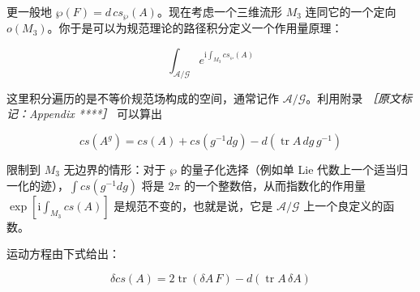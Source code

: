 
更一般地 $\wp(F)=d\,cs_\wp(A)$。现在考虑一个三维流形 $M_3$ 连同它的一个定向 $o(M_3)$。你于是可以为规范理论的路径积分定义一个作用量原理：

\begin{equation}
  \int_{\mathcal{A}/\mathcal{G}} e^{\mathrm{i}\int_{M_3}cs_\wp(A)}
  \tag{1.4}
  \label{eq:1.4}
\end{equation}

这里积分遍历的是不等价规范场构成的空间，通常记作 $\mathcal{A}/\mathcal{G}$。利用附录 {\small\itshape ［原文标记：Appendix ****］}%
可以算出

\begin{equation}
  cs(A^{g})=cs(A)+cs(g^{-1}dg)-d(\operatorname{tr}A\,dg\,g^{-1})
  \tag{1.5}
  \label{eq:1.5}
\end{equation}

限制到 $M_3$ 无边界的情形：对于 $\wp$ 的量子化选择（例如单 Lie 代数上一个适当归一化的迹），$\int cs(g^{-1}dg)$ 将是 $2\pi$ 的一个整数倍，从而指数化的作用量 $\exp[\mathrm{i}\int_{M_3}cs(A)]$ 是规范不变的，也就是说，它是 $\mathcal{A}/\mathcal{G}$ 上一个良定义的函数。

运动方程由下式给出：

\begin{equation}
  \delta cs(A)=2\operatorname{tr}(\delta A\,F)-d(\operatorname{tr}A\,\delta A)
  \tag{1.6}
  \label{eq:1.6}
\end{equation}



